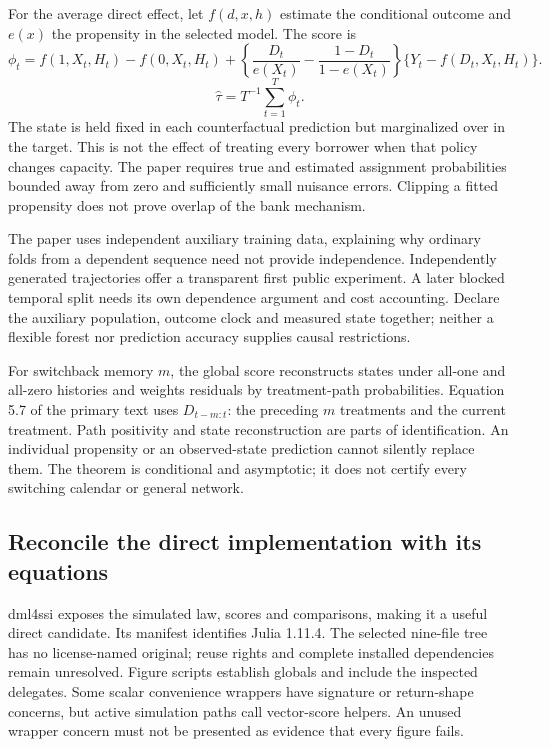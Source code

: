 For the average direct effect, let $f(d,x,h)$ estimate the conditional outcome
and $e(x)$ the propensity in the selected model. The score is
\[
 \phi_t=f(1,X_t,H_t)-f(0,X_t,H_t)
 +\left\{\frac{D_t}{e(X_t)}-\frac{1-D_t}{1-e(X_t)}\right\}
   \{Y_t-f(D_t,X_t,H_t)\}.
\]
\[
 \widehat\tau=T^{-1}\sum_{t=1}^T\phi_t.
\]
The state is held fixed in each counterfactual prediction but marginalized
over in the target. This is not the effect of treating every borrower when
that policy changes capacity. The paper requires true and estimated assignment
probabilities bounded away from zero and sufficiently small nuisance errors.
Clipping a fitted propensity does not prove overlap of the bank mechanism.
\citep{exec25_onet_paper}

The paper uses independent auxiliary training data, explaining why ordinary
folds from a dependent sequence need not provide independence. Independently
generated trajectories offer a transparent first public experiment. A later
blocked temporal split needs its own dependence argument and cost accounting.
Declare the auxiliary population, outcome clock and measured state together;
neither a flexible forest nor prediction accuracy supplies causal restrictions.
\citep{exec25_onet_paper,exec25_onet_choice}

For switchback memory $m$, the global score reconstructs states under all-one
and all-zero histories and weights residuals by treatment-path probabilities.
Equation 5.7 of the primary text uses $D_{t-m:t}$: the preceding $m$ treatments
and the current treatment. Path positivity and state reconstruction are parts
of identification. An individual propensity or an observed-state prediction
cannot silently replace them. The theorem is conditional and asymptotic; it
does not certify every switching calendar or general network.
\citep{exec25_onet_paper}

\subsection{Reconcile the direct implementation with its equations}

dml4ssi exposes the simulated law, scores and comparisons, making it a useful
direct candidate. Its manifest identifies Julia 1.11.4. The selected nine-file
tree has no license-named original; reuse rights and complete installed
dependencies remain unresolved. Figure scripts establish globals and include
the inspected delegates. Some scalar convenience wrappers have signature or
return-shape concerns, but active simulation paths call vector-score helpers.
An unused wrapper concern must not be presented as evidence that every figure
fails.\citep{exec25_onet_dml}

